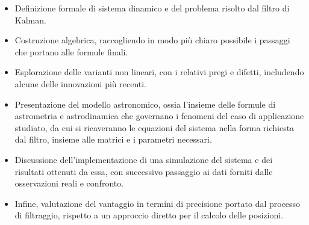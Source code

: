 \documentclass[12pt,a4paper,openright,twoside]{book}
\begin{document}
\begin{itemize}
\item Definizione formale di sistema dinamico e del problema risolto dal filtro di Kalman.
\item Costruzione algebrica, raccogliendo in modo più chiaro possibile i passaggi che portano alle formule finali.
\item Esplorazione delle varianti non lineari, con i relativi pregi e difetti, includendo alcune delle innovazioni più recenti.
\item Presentazione del modello astronomico, ossia l'insieme delle formule di astrometria e astrodinamica che governano i fenomeni del caso di applicazione studiato, da cui si ricaveranno le equazioni del sistema nella forma richiesta dal filtro, insieme alle matrici e i parametri necessari.
\item Discussione dell'implementazione di una simulazione del sistema e dei risultati ottenuti da essa, con successivo passaggio ai dati forniti dalle osservazioni reali e confronto.
\item Infine, valutazione del vantaggio in termini di precisione portato dal processo di filtraggio, rispetto a un approccio diretto per il calcolo delle posizioni.
\end{itemize}

\end{document}

